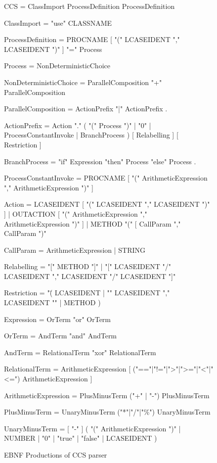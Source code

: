 	\begin{figure}
\begin{codeblock}
CCS = { ClassImport } ProcessDefinition { ProcessDefinition } 

ClassImport = "use" CLASSNAME 

ProcessDefinition = 
  PROCNAME [ "(" LCASEIDENT {"," LCASEIDENT } ")" ] "=" Process 

Process = NonDeterministicChoice

NonDeterministicChoice = ParallelComposition { "+" ParallelComposition }

ParallelComposition = ActionPrefix { "|" ActionPrefix } .

ActionPrefix =
  { Action "." }
  (
    "(" Process ")"
    | "0"
    | ProcessConstantInvoke
    | BranchProcess
  )
  [ Relabelling ]
  [ Restriction ]

BranchProcess = "if" Expression "then" Process "else" Process .

ProcessConstantInvoke = 
  PROCNAME [ "(" ArithmeticExpression {"," ArithmeticExpression } ")" ]

Action =
  LCASEIDENT [ "(" LCASEIDENT { "," LCASEIDENT } ")" ]
  | OUTACTION [ "(" ArithmeticExpression { "," ArithmeticExpression } ")" ]
  | METHOD "(" [ CallParam { "," CallParam } ")"

CallParam = ArithmeticExpression | STRING

Relabelling =
  "[" METHOD "]"
  | "[" LCASEIDENT "/" LCASEIDENT { "," LCASEIDENT "/" LCASEIDENT } "]"

Restriction = 
  "\" 
  (
    LCASEIDENT 
    | "{" LCASEIDENT {"," LCASEIDENT } "}"
    | METHOD
  )        

Expression = OrTerm { "or" OrTerm }

OrTerm = AndTerm { "and" AndTerm }

AndTerm = RelationalTerm { "xor" RelationalTerm }

RelationalTerm = 
  ArithmeticExpression [ ("=="|"!="|">"|">="|"<"|"<=") ArithmeticExpression ]
		
ArithmeticExpression = PlusMinusTerm { ("+" | "-") PlusMinusTerm }

PlusMinusTerm = UnaryMinusTerm { ("*"|"/"|"\%") UnaryMinusTerm }

UnaryMinusTerm =
  [ "-" ]                                   
  (
    "(" ArithmeticExpression ")"
    | NUMBER 
    | "0"
    | "true"
    | "false"
    | LCASEIDENT
  )
	\end{codeblock}
	\caption{EBNF Productions of CCS parser}\label{fig:ccs_ebnf}
	\end{figure}
	
